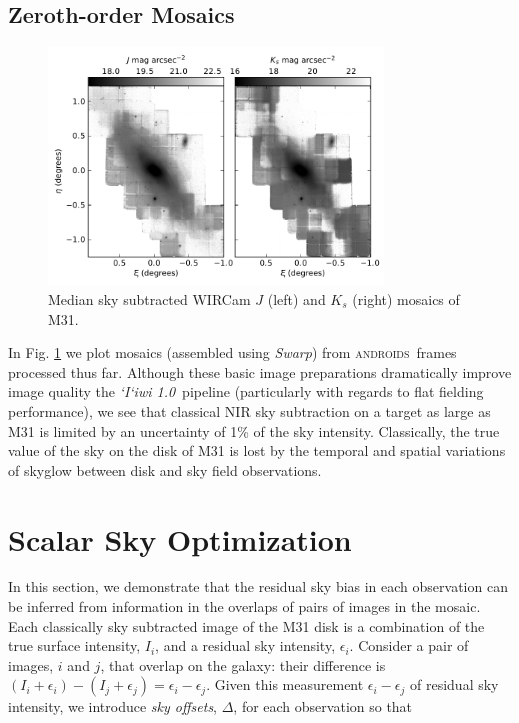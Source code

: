 \documentclass[iop]{emulateapj}
\newcommand{\sw}[1]{\textit{#1}} %
\newcommand{\iiwione}{\sw{`I`iwi 1.0}}
\newcommand{\androids}{\textsc{androids}}
\begin{document}
\subsection{Zeroth-order Mosaics}
\label{sec:rawmosaic}

\begin{figure}[t]
	\centering
		\includegraphics[width=3.5in]{figs/raw_mosaics}
	\caption{Median sky subtracted WIRCam $J$ (left) and $K_s$ (right) mosaics of M31.}
	\label{fig:raw_mosaics}
\end{figure}

In Fig. \ref{fig:raw_mosaics} we plot mosaics (assembled using \sw{Swarp}) from \androids\ frames processed thus far. Although these basic image preparations dramatically improve image quality the \iiwione\ pipeline (particularly with regards to flat fielding performance), we see that classical NIR sky subtraction on a target as large as M31 is limited by an uncertainty of 1\% of the sky intensity. Classically, the true value of the sky on the disk of M31 is lost by the temporal and spatial variations of skyglow between disk and sky field observations.

\section{Scalar Sky Optimization}
\label{sec:scalar}

In this section, we demonstrate that the residual sky bias in each observation can be inferred from information in the overlaps of pairs of images in the mosaic. Each classically sky subtracted image of the M31 disk is a combination of the true surface intensity, $I_i$, and a residual sky intensity, $\epsilon_i$. Consider a pair of images, $i$ and $j$, that overlap on the galaxy: their difference is $(I_i+\epsilon_i) - (I_j+\epsilon_j) = \epsilon_i - \epsilon_j$. Given this measurement $\epsilon_i - \epsilon_j$ of residual sky intensity, we introduce \emph{sky offsets}, $\Delta$, for each observation so that
\end{document}
